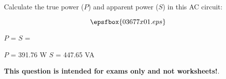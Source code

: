 

Calculate the true power ($P$) and apparent power ($S$) in this AC circuit:

$$\epsfbox{03677x01.eps}$$

$P$ = \hskip 150pt $S$ = 







$P$ = 391.76 W \hskip 100pt $S$ = 447.65 VA







{\bf This question is intended for exams only and not worksheets!}.



